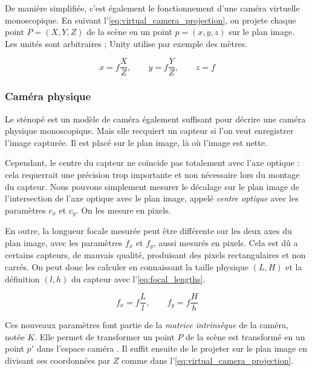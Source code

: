 De manière simplifiée, c'est également le fonctionnement d'une caméra virtuelle monoscopique. En suivant l'\autoref{eq:virtual_camera_projection}, on projete chaque point $P=(X,Y,Z)$ de la scène en un point $p=(x,y,z)$ sur le plan image. Les unités sont arbitraires ; Unity utilise par exemple des mètres.

\begin{equation}
  \label{eq:virtual_camera_projection}
  x = f \frac{X}{Z},\qquad y = f \frac{Y}{Z},\qquad z = f
\end{equation}

\subsubsection{Caméra physique}
Le sténopé est un modèle de caméra également suffisant pour décrire une caméra physique monoscopique. Mais elle recquiert un capteur si l'on veut enregistrer l'image capturée. Il est placé sur le plan image, là où l'image est nette.

Cependant, le centre du capteur ne coïncide pas totalement avec l'axe optique : cela requerrait une précision trop importante et non nécessaire lors du montage du capteur. Nous pouvons simplement mesurer le décalage sur le plan image de l'intersection de l'axe optique avec le plan image, appelé \emph{centre optique} avec les paramètres $c_x$ et $c_y$. On les mesure en pixels.

En outre, la longueur focale mesurée peut être différente sur les deux axes du plan image, avec les paramètres $f_x$ et $f_y$, aussi mesurés en pixels. Cela est dû a certains capteurs, de mauvais qualité, produisant des pixels rectangulaires et non carrés. On peut donc les calculer en connaissant la taille physique $(L,H)$ et la définition $(l,h)$ du capteur avec l'\autoref{eq:focal_lengths}.

\begin{equation}
  \label{eq:focal_lengths}
  f_x = f \frac{L}{l},\qquad f_y = f \frac{H}{h}
\end{equation}

Ces nouveaux paramètres font partie de la \emph{matrice intrinsèque} de la caméra, notée $K$. Elle permet de transformer un point $P$ de la scène est transformé en un point $p'$ dans l'espace caméra . Il suffit ensuite de le projeter sur le plan image en divisant ses coordonnées par $Z$ comme dans l'\autoref{eq:virtual_camera_projection}.

